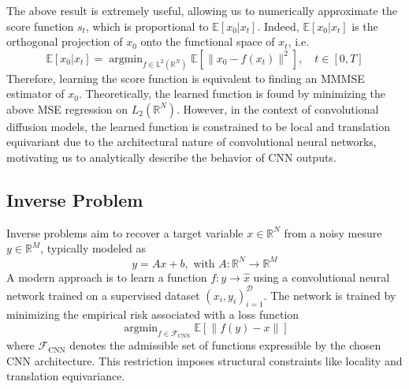 \documentclass[a4paper,10pt]{article}
\theoremstyle{definition} %
\theoremstyle{definition} %
\theoremstyle{definition} %
\theoremstyle{definition} %
\DeclareMathOperator*{\argmin}{argmin}
\newcommand{\R}{\mathbb{R}}
\newcommand{\E}[1]{\mathbb{E} \left[ {#1} \right] }
\newcommand{\norm}[1]{\left\| #1 \right \|}
\newcommand{\0}{\boldsymbol{0}}
\begin{document}
The above result is extremely useful, allowing us to numerically approximate the score function $s_t$, which is proportional to $\mathbb{E}[x_0 | x_t]$. Indeed, $\mathbb{E}[x_0 | x_t]$ is the orthogonal projection of $x_0$ onto the functional space of $x_t$, i.e. 
\[
\mathbb{E}[x_0 | x_t] = \argmin_{f \in \mathbb{L}^2(\mathbb{R}^N)} \mathbb{E}\left[ \| x_0 - f(x_t) \|^2 \right], \quad t \in [0,T]
\]
Therefore, learning the score function is equivalent to finding an MMMSE estimator of $x_0$. Theoretically, the learned function is found by minimizing the above MSE regression on $L_2(\R^N)$. However, in the context of convolutional diffusion models, the learned function is constrained to be local and translation equivariant due to the architectural nature of convolutional neural networks, motivating us to analytically describe the behavior of CNN outputs.


\subsection{Inverse Problem}
Inverse problems aim to recover a target variable $x \in \R^N$ from a noisy mesure $y \in \R^M$, typically modeled as
\begin{equation*}
    y = Ax +b, \text{ with } A:\R^N \rightarrow \R^M
\end{equation*}
A modern approach is to learn a function $f : y \rightarrow \hat{x}$ using a convolutional neural network trained on a supervised dataset ${(x_i,y_i)}_{i=1}^\mathcal{D}$. The network is trained by minimizing the empirical risk associated with a loss function
\begin{equation*}
    \argmin_{f\in \mathcal{F}_{\text{CNN}}} \E{\norm{f(y)-x}}
\end{equation*}
where $\mathcal{F}_{\text{CNN}}$ denotes the admissible set of functions expressible by the chosen CNN architecture. This restriction imposes structural constraints like locality and translation equivariance.
\end{document}
